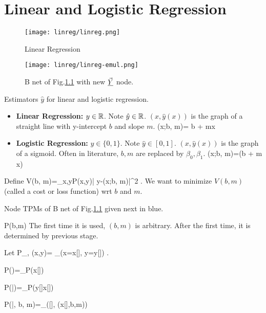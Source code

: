 \chapter{Linear and Logistic Regression}

\begin{figure}[h!]
\centering
\texttt{[image: linreg/linreg.png]}
\caption{Linear Regression} 
\label{fig-linreg}
\end{figure}

\begin{figure}[h!]
\centering
\texttt{[image: linreg/linreg-emul.png]}
\caption{B net of Fig.\ref{fig-linreg}  with new $\vec{\underline{Y}}$ node.}\label{fig-linreg-emul}
\end{figure}



Estimators $\hat{y}$ for linear and logistic regression.
\begin{itemize}
\item 

\textbf{Linear Regression:} $y\in { \mathbb{R}}$. 
Note $\hat{y}\in { \mathbb{R}}$. $(x,\hat{y}(x))$ is
the graph
of a straight line 
with y-intercept $b$ and slope $m$.
\beq
{}(x;b, m)= b + mx
\eeq

\item
\textbf{Logistic Regression:} $y\in\{0, 1\}$. Note $\hat{y}\in [0,1]$. $
(x,\hat{y}(x))$ is the graph
of a sigmoid.
 Often in literature, $b,m$ are replaced by $\beta_0, \beta_1$. 
\beq
{}(x;b, m)=\sig(b + m x)
\eeq
\end{itemize}

Define
\beq
V(b, m)=\sum_{x,y}P(x,y)| y-(x;b, m)|^2
\;.\label{eq-norm-cost}
\eeq
We want to minimize $V(b,m)$ (called a cost or loss function) wrt $b$ and $m$.


Node TPMs of B net of Fig.\ref{fig-linreg}
given next in blue.

\beq\color{blue}
P(b,m) 
\eeq
The first time it is used, 
$(b,m)$ is arbitrary.
After the first time, it is determined 
by previous stage.

Let 
\beq
P_{\rvx, \rvy}(x,y)=
\sum_\sigma \indi(x=x[\sigma], y=y[\sigma])
\;.
\eeq

\beq\color{blue}
P(\vecx)=\prod_\sigma P(x[\sigma])
\eeq

\beq\color{blue}
P(\vecy|\vecx)=\prod_\sigma P(y[\sigma]\cond x[\sigma])
\eeq

\beq\color{blue}
P(|\vecx, b, m)=\prod_\sigma \delta([\sigma], (x[\sigma],b,m))
\label{eq-replace1}
\eeq

